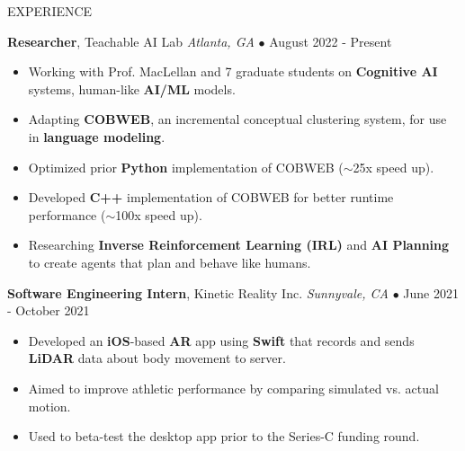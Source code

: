 \documentclass{resume} %
\begin{document}
\begin{rSection}{EXPERIENCE}
\begin{itemize}
\end{itemize}

\vspace{-1mm}

\textbf{Researcher}, Teachable AI Lab \hfill \textit{Atlanta, GA} $\bullet$ August 2022 - Present
\vspace{-2mm}
\begin{itemize}
\itemsep -6pt {}

\item Working with Prof. MacLellan and 7 graduate students on \textbf{Cognitive AI} systems, human-like \textbf{AI/ML} models.
\item Adapting \textbf{COBWEB}, an incremental conceptual clustering system, for use in \textbf{language modeling}.
\item Optimized prior \textbf{Python} implementation of COBWEB (\(\sim \)25x speed up).
\item Developed \textbf{C++} implementation of COBWEB for better runtime performance (\(\sim \)100x speed up).
\item Researching \textbf{Inverse Reinforcement Learning (IRL)} and \textbf{AI Planning} to create agents that plan and behave like humans.

\end{itemize}

\vspace{-1mm}

\textbf{Software Engineering Intern}, Kinetic Reality Inc. \hfill \textit{Sunnyvale, CA} $\bullet$ June 2021 - October 2021
\vspace{-2mm}
\begin{itemize}
\itemsep -6pt {}

\item Developed an \textbf{iOS}-based \textbf{AR} app using \textbf{Swift} that records and sends \textbf{LiDAR} data about body movement to server.
\item Aimed to improve athletic performance by comparing simulated vs. actual motion.
\item Used to beta-test the desktop app prior to the Series-C funding round.

\end{itemize}

\end{rSection}


\end{document}
